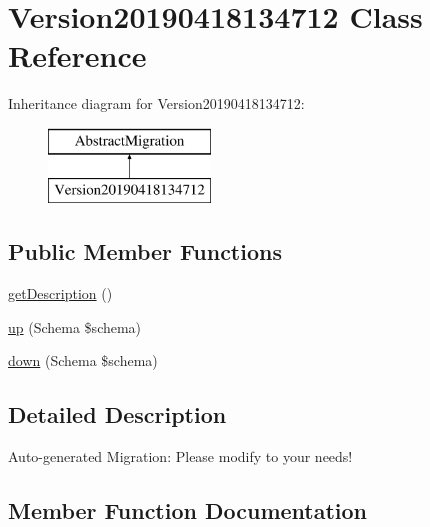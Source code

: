 \hypertarget{class_doctrine_migrations_1_1_version20190418134712}{}\section{Version20190418134712 Class Reference}
\label{class_doctrine_migrations_1_1_version20190418134712}
Inheritance diagram for Version20190418134712\+:\begin{figure}[H]
\begin{center}
\leavevmode
\includegraphics[height=2.000000cm]{class_doctrine_migrations_1_1_version20190418134712}
\end{center}
\end{figure}
\subsection*{Public Member Functions}
\begin{DoxyCompactItemize}
\item 
\mbox{\hyperlink{class_doctrine_migrations_1_1_version20190418134712_a2e7bb35c71bf1824456ceb944cb7a845}{get\+Description}} ()
\item 
\mbox{\hyperlink{class_doctrine_migrations_1_1_version20190418134712_a23eb1c1428e8ea2ab2cf798fc06ec421}{up}} (Schema \$schema)
\item 
\mbox{\hyperlink{class_doctrine_migrations_1_1_version20190418134712_aa8eb70255a46429d4d6165c778c9e5b9}{down}} (Schema \$schema)
\end{DoxyCompactItemize}


\subsection{Detailed Description}
Auto-\/generated Migration\+: Please modify to your needs! 

\subsection{Member Function Documentation}
\mbox{\label{class_doctrine_migrations_1_1_version20190418134712_aa8eb70255a46429d4d6165c778c9e5b9}} 
